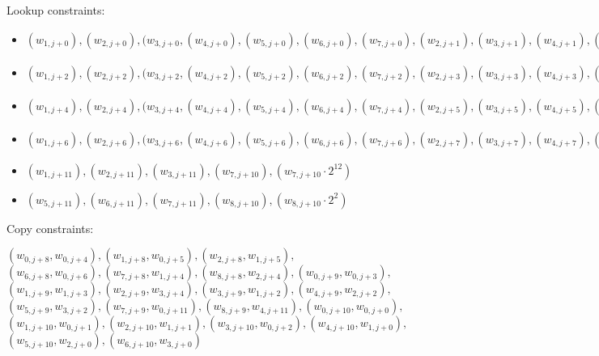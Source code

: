 Lookup constraints:
\begin{itemize}
\item $(w_{1, j + 0}), (w_{2, j + 0}), (w_{3, j + 0}, (w_{4, j + 0}), (w_{5, j + 0}), (w_{6, j + 0}), (w_{7, j + 0}), (w_{2, j + 1}), (w_{3, j + 1}), (w_{4, j + 1}), (w_{5, j + 1}), (w_{6, j + 1}), (w_{7, j + 1}, w_{8, j + 1}), (w_{7, j + 1} \cdot 2^{5})$
\item $(w_{1, j + 2}), (w_{2, j + 2}), (w_{3, j + 2}, (w_{4, j + 2}), (w_{5, j + 2}), (w_{6, j + 2}), (w_{7, j + 2}), (w_{2, j + 3}), (w_{3, j + 3}), (w_{4, j + 3}), (w_{5, j + 3}), (w_{6, j + 3}), (w_{7, j + 3}, w_{8, j + 3}), (w_{7, j + 3} \cdot 2^{5})$
\item $(w_{1, j + 4}), (w_{2, j + 4}), (w_{3, j + 4}, (w_{4, j + 4}), (w_{5, j + 4}), (w_{6, j + 4}), (w_{7, j + 4}), (w_{2, j + 5}), (w_{3, j + 5}), (w_{4, j + 5}), (w_{5, j + 5}), (w_{6, j + 5}), (w_{7, j + 5}, w_{8, j + 5}), (w_{7, j + 5} \cdot 2^{5})$
\item $(w_{1, j + 6}), (w_{2, j + 6}), (w_{3, j + 6}, (w_{4, j + 6}), (w_{5, j + 6}), (w_{6, j + 6}), (w_{7, j + 6}), (w_{2, j + 7}), (w_{3, j + 7}), (w_{4, j + 7}), (w_{5, j + 7}), (w_{6, j + 7}), (w_{7, j + 7}, w_{8, j + 7}), (w_{7, j + 7} \cdot 2^{5})$
\item $(w_{1, j + 11}), (w_{2, j + 11}), (w_{3, j + 11}), (w_{7, j + 10}), (w_{7, j + 10} \cdot 2^{12})$
\item $(w_{5, j + 11}), (w_{6, j + 11}), (w_{7, j + 11}), (w_{8, j + 10}), (w_{8, j + 10} \cdot 2^{2})$
\end{itemize}

Copy constraints:
\begin{center}
$(w_{0, j + 8}, w_{0, j + 4}), (w_{1, j + 8}, w_{0, j + 5}), (w_{2, j + 8}, w_{1, j + 5}), $\\$ (w_{6, j + 8}, w_{0, j + 6}), (w_{7, j + 8}, w_{1, j + 4}), (w_{8, j + 8}, w_{2, j + 4}), (w_{0, j + 9}, w_{0, j + 3}), $\\$(w_{1, j + 9}, w_{1, j + 3}), (w_{2, j + 9}, w_{3, j + 4}), (w_{3, j + 9}, w_{1, j + 2}), (w_{4, j + 9}, w_{2, j + 2}), $\\$(w_{5, j + 9}, w_{3, j + 2}), (w_{7, j + 9}, w_{0, j + 11}), (w_{8, j + 9}, w_{4, j + 11}), (w_{0, j + 10}, w_{0, j + 0}),$\\$ (w_{1, j + 10}, w_{0, j + 1}), (w_{2, j + 10}, w_{1, j + 1}), (w_{3, j + 10}, w_{0, j + 2}), (w_{4, j + 10}, w_{1, j + 0}),$\\$ (w_{5, j + 10}, w_{2, j + 0}), (w_{6, j + 10}, w_{3, j + 0})$
\end{center}

